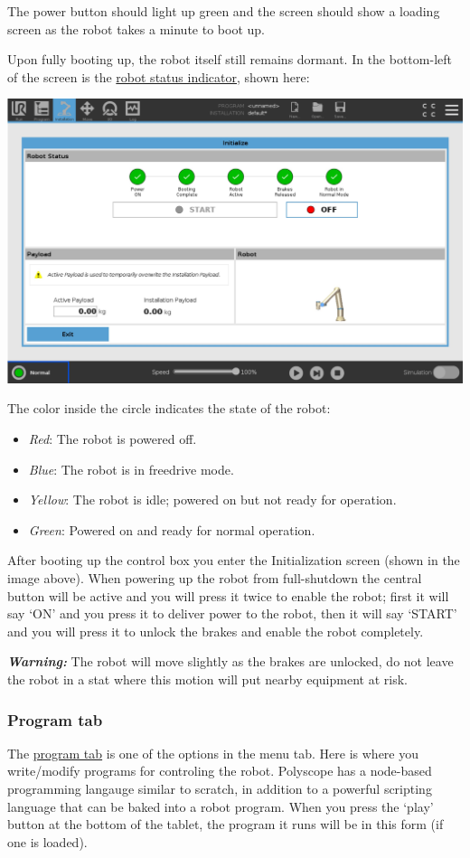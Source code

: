 \documentclass[11pt]{article}
\begin{document}
The power button should light up green and the screen should show a loading screen as the robot takes a minute to boot up.

Upon fully booting up, the robot itself still remains dormant. In the bottom-left of the screen is the \uline{robot status indicator}, shown here:

\begin{center}
\includegraphics[width=.9\linewidth]{figures/robot_state_menu.jpg}
\end{center}

The color inside the circle indicates the state of the robot:
\begin{itemize}
    \item \emph{Red}: The robot is powered off.
    \item \emph{Blue}: The robot is in freedrive mode.
    \item \emph{Yellow}: The robot is idle; powered on but not ready for operation.
    \item \emph{Green}: Powered on and ready for normal operation.
\end{itemize}

After booting up the control box you enter the Initialization screen (shown in the image above). When powering up the robot from full-shutdown the central button will be active and you will press it twice to enable the robot; first it will say `ON' and you press it to deliver power to the robot, then it will say `START' and you will press it to unlock the brakes and enable the robot completely.

\textit{\textbf{Warning:}} The robot will move slightly as the brakes are unlocked, do not leave the robot in a stat where this motion will put nearby equipment at risk.

\subsubsection{Program tab}
The \hyperlink{https://s3-eu-west-1.amazonaws.com/ur-support-site/44018/Software_Manual_en_Global.pdf\#page=103}{program tab} is one of the options in the menu tab. Here is where you write/modify programs for controling the robot.
Polyscope has a node-based programming langauge similar to scratch, in addition to a powerful scripting language that can be baked into a robot program.
When you press the `play' button at the bottom of the tablet, the program it runs will be in this form (if one is loaded).
\end{document}
